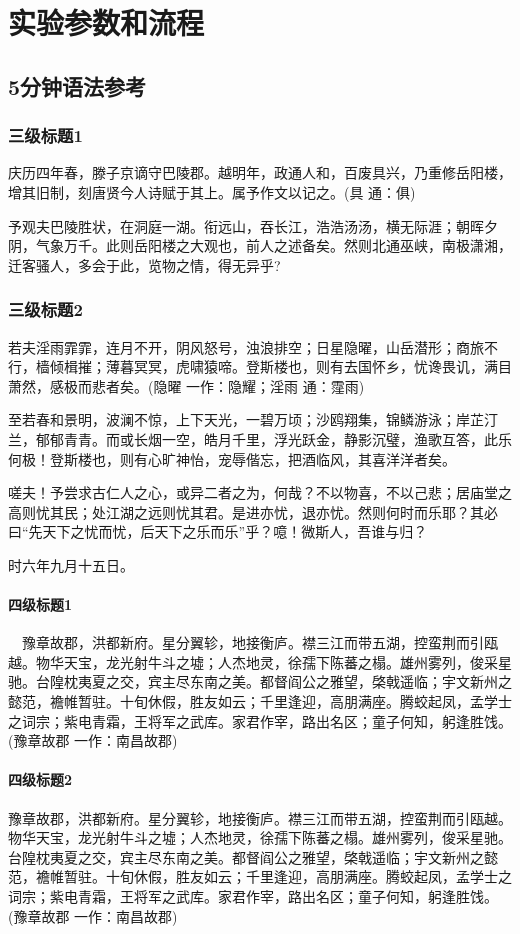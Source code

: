 \chapter{实验参数和流程}
\section{5分钟语法参考}
\subsection{三级标题1}
庆历四年春，滕子京谪守巴陵郡。越明年，政通人和，百废具兴，乃重修岳阳楼，增其旧制，刻唐贤今人诗赋于其上。属予作文以记之。(具 通：俱)

予观夫巴陵胜状，在洞庭一湖。衔远山，吞长江，浩浩汤汤，横无际涯；朝晖夕阴，气象万千。此则岳阳楼之大观也，前人之述备矣。然则北通巫峡，南极潇湘，迁客骚人，多会于此，览物之情，得无异乎?
\subsection{三级标题2}

若夫淫雨霏霏，连月不开，阴风怒号，浊浪排空；日星隐曜，山岳潜形；商旅不行，樯倾楫摧；薄暮冥冥，虎啸猿啼。登斯楼也，则有去国怀乡，忧谗畏讥，满目萧然，感极而悲者矣。(隐曜 一作：隐耀；淫雨 通：霪雨)

至若春和景明，波澜不惊，上下天光，一碧万顷；沙鸥翔集，锦鳞游泳；岸芷汀兰，郁郁青青。而或长烟一空，皓月千里，浮光跃金，静影沉璧，渔歌互答，此乐何极！登斯楼也，则有心旷神怡，宠辱偕忘，把酒临风，其喜洋洋者矣。

嗟夫！予尝求古仁人之心，或异二者之为，何哉？不以物喜，不以己悲；居庙堂之高则忧其民；处江湖之远则忧其君。是进亦忧，退亦忧。然则何时而乐耶？其必曰“先天下之忧而忧，后天下之乐而乐”乎？噫！微斯人，吾谁与归？

时六年九月十五日。
\subsubsection{四级标题1}
　豫章故郡，洪都新府。星分翼轸，地接衡庐。襟三江而带五湖，控蛮荆而引瓯越。物华天宝，龙光射牛斗之墟；人杰地灵，徐孺下陈蕃之榻。雄州雾列，俊采星驰。台隍枕夷夏之交，宾主尽东南之美。都督阎公之雅望，棨戟遥临；宇文新州之懿范，襜帷暂驻。十旬休假，胜友如云；千里逢迎，高朋满座。腾蛟起凤，孟学士之词宗；紫电青霜，王将军之武库。家君作宰，路出名区；童子何知，躬逢胜饯。(豫章故郡 一作：南昌故郡)
\subsubsection{四级标题2}
豫章故郡，洪都新府。星分翼轸，地接衡庐。襟三江而带五湖，控蛮荆而引瓯越。物华天宝，龙光射牛斗之墟；人杰地灵，徐孺下陈蕃之榻。雄州雾列，俊采星驰。台隍枕夷夏之交，宾主尽东南之美。都督阎公之雅望，棨戟遥临；宇文新州之懿范，襜帷暂驻。十旬休假，胜友如云；千里逢迎，高朋满座。腾蛟起凤，孟学士之词宗；紫电青霜，王将军之武库。家君作宰，路出名区；童子何知，躬逢胜饯。(豫章故郡 一作：南昌故郡)
